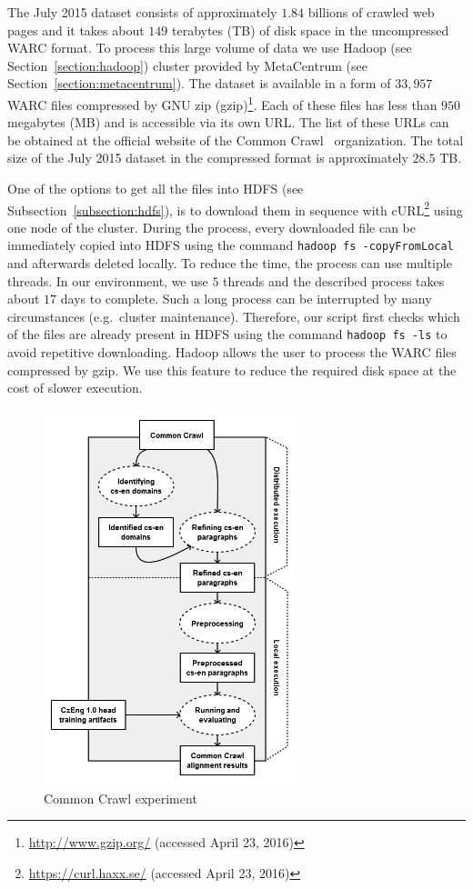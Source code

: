The July 2015 dataset consists of approximately $1.84$ billions of crawled web pages and it takes about $149$ terabytes (TB) of disk space in the uncompressed WARC format. To process this large volume of data we use Hadoop (see Section~\ref{section:hadoop}) cluster provided by MetaCentrum (see Section~\ref{section:metacentrum}). The dataset is available in a form of $33,957$ WARC files compressed by GNU zip (gzip)\footnote{\url{http://www.gzip.org/} (accessed April 23, 2016)}. Each of these files has less than $950$ megabytes (MB) and is accessible via its own URL. The list of these URLs can be obtained at the official website of the Common Crawl~\cite{CommonCrawl} organization. The total size of the July 2015 dataset in the compressed format is approximately $28.5$ TB.

One of the options to get all the files into HDFS (see Subsection~\ref{subsection:hdfs}), is to download them in sequence with cURL\footnote{\url{https://curl.haxx.se/} (accessed April 23, 2016)} using one node of the cluster. During the process, every downloaded file can be immediately copied into HDFS using the command \texttt{hadoop fs -copyFromLocal} and afterwards deleted locally. To reduce the time, the process can use multiple threads. In our environment, we use $5$ threads and the described process takes about $17$ days to complete. Such a long process can be interrupted by many circumstances (e.g.\ cluster maintenance). Therefore, our script first checks which of the files are already present in HDFS using the command \texttt{hadoop fs -ls} to avoid repetitive downloading. Hadoop allows the user to process the WARC files compressed by gzip. We use this feature to reduce the required disk space at the cost of slower execution.

\begin{figure}[!htb]
	\centering
	\caption{Common Crawl experiment}
	\label{figure:common_crawl_experiment}
	\vspace{1em}
	\includegraphics[width=0.65\textwidth]{images/common_crawl_experiment.png}
\end{figure}

